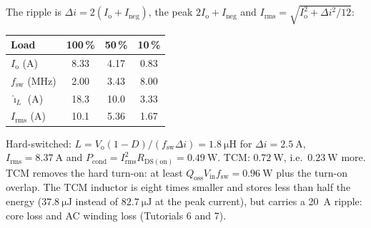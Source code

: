 
\begin{solutionblock}
	The ripple is $\Delta i=2(I_\mathrm{o}+I_\mathrm{neg})$, the peak $2I_\mathrm{o}+I_\mathrm{neg}$ and $I_\mathrm{rms}=\sqrt{I_\mathrm{o}^2+\Delta i^2/12}$:
	\begin{center}
		\begin{tabular}{|l|c|c|c|}
			\hline
			Load                            & 100\,\% & 50\,\% & 10\,\% \\
			\hline
			$I_\mathrm{o}$ (A)              & 8.33    & 4.17   & 0.83   \\
			$f_\mathrm{sw}$ (MHz)           & 2.00    & 3.43   & 8.00   \\
			$\hat{\imath}_L$ (A)            & 18.3    & 10.0   & 3.33   \\
			$I_\mathrm{rms}$ (A)            & 10.1    & 5.36   & 1.67   \\
			\hline
		\end{tabular}
		\label{tab:ex08_tcm}
	\end{center}
\end{solutionblock}


\begin{solutionblock}
	Hard-switched: $L=V_\mathrm{o}(1-D)/(f_\mathrm{sw}\Delta i)=\SI{1.8}{\micro\henry}$ for $\Delta i=\SI{2.5}{\ampere}$, $I_\mathrm{rms}=\SI{8.37}{\ampere}$ and $P_\mathrm{cond}=I_\mathrm{rms}^2R_\mathrm{DS(on)}=\SI{0.49}{\watt}$. TCM: $\SI{0.72}{\watt}$, i.e.\ $\SI{0.23}{\watt}$ more.
	TCM removes the hard turn-on: at least $Q_\mathrm{oss}V_\mathrm{in}f_\mathrm{sw}=\SI{0.96}{\watt}$ plus the turn-on overlap. The TCM inductor is eight times smaller and stores less than half the energy ($\SI{37.8}{\micro\joule}$ instead of $\SI{82.7}{\micro\joule}$ at the peak current), but carries a \SI{20}{\ampere} ripple: core loss and AC winding loss (Tutorials 6 and 7).
\end{solutionblock}


